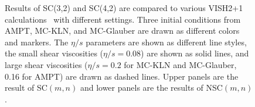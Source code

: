\documentclass[ALICE,manyauthors]{cernphprep}
\begin{document}
\begin{figure}[!p]
\begin{center}
        \caption{Results of  SC(3,2) and SC(4,2) are compared to various VISH2+1 calculations~\cite{Zhu:2016puf} with different settings. Three initial conditions from AMPT, MC-KLN, and MC-Glauber  are drawn as different colors and markers. The $\eta/s$ parameters are shown as different line styles, the small shear viscosities ($\eta/s=0.08$) are shown as solid lines, and large shear viscosities ($\eta/s=0.2$ for MC-KLN and MC-Glauber, 0.16 for AMPT) are drawn as dashed lines. Upper panels are the result of SC$(m,n)$ and lower panels are the results of NSC$(m,n)$.}
         \label{fig:Figure_4}
        \end{center}   
 \end{figure}
 
\end{document}
